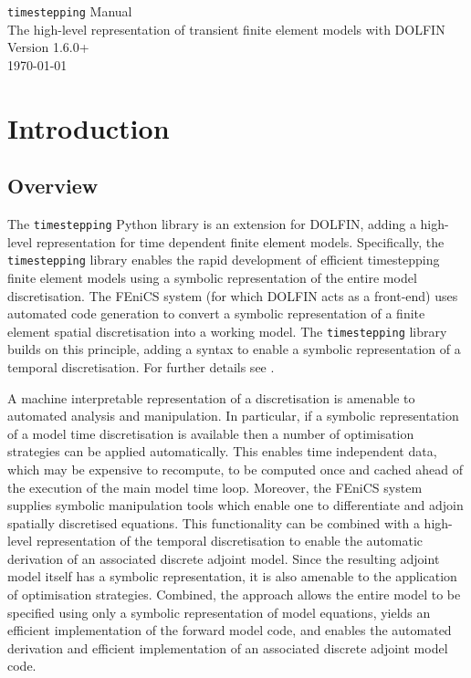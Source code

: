 \documentclass[a4paper]{book}
\newcommand{\version}{1.6.0+}
\begin{document}
\begin{titlepage}
\begin{center}

\Huge{\verb+timestepping+ Manual} \\[0.02\textheight]
\large{The high-level representation of transient finite element models with DOLFIN} \\[0.02\textheight]
\Huge{Version \version} \\[0.15\textheight]
\vfill
\large{\today}

\end{center}
\end{titlepage}

\tableofcontents

\chapter{Introduction}

\section{Overview}

The \verb+timestepping+ Python library is an extension for DOLFIN, adding a
high-level representation for time dependent finite element models.
Specifically, the \verb+timestepping+ library enables the rapid development of
efficient timestepping finite element models using a symbolic representation of
the entire model discretisation. The FEniCS system (for which DOLFIN acts as a
front-end) uses automated code generation to convert a symbolic representation
of a finite element spatial discretisation into a working model. The
\verb+timestepping+ library builds on this principle, adding a syntax to enable
a symbolic representation of a temporal discretisation. For further details
see \citet{maddison2014}.

A machine interpretable representation of a discretisation is amenable to
automated analysis and manipulation. In particular, if a symbolic representation
of a model time discretisation is available then a number of optimisation
strategies can be applied automatically. This enables time independent data,
which may be expensive to recompute, to be computed once and cached ahead of the
execution of the main model time loop. Moreover, the FEniCS system supplies
symbolic manipulation tools which enable one to differentiate and adjoin
spatially discretised equations. This functionality can be combined with a
high-level representation of the temporal discretisation to enable the automatic
derivation of an associated discrete adjoint model. Since the resulting adjoint
model itself has a symbolic representation, it is also amenable to the
application of optimisation strategies. Combined, the approach allows the entire
model to be specified using only a symbolic representation of model equations,
yields an efficient implementation of the forward model code, and enables the
automated derivation and efficient implementation of an associated discrete
adjoint model code.
\end{document}
